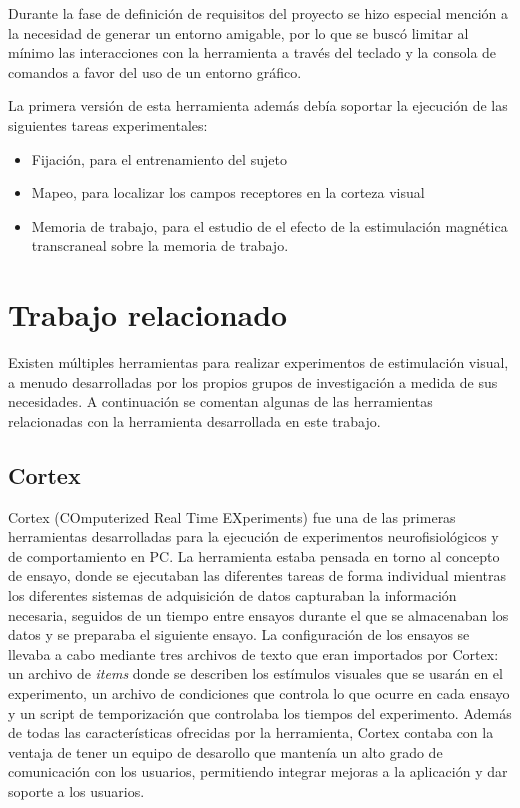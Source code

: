 \documentclass[conference]{IEEEtran}
\begin{document}
Durante la fase de definición de requisitos del proyecto se hizo especial mención a la necesidad de generar un entorno amigable, por lo que se buscó limitar al mínimo las interacciones con la herramienta a través del teclado y la consola de comandos a favor del uso de un entorno gráfico.

La primera versión de esta herramienta además debía soportar la ejecución de las siguientes tareas experimentales:

\begin{itemize}
	\item Fijación, para el entrenamiento del sujeto
	\item Mapeo, para localizar los campos receptores en la corteza visual
	\item Memoria de trabajo, para el estudio de el efecto de la estimulación magnética transcraneal sobre la memoria de trabajo.
\end{itemize}

\section{Trabajo relacionado}

Existen múltiples herramientas para realizar experimentos de estimulación visual, a menudo desarrolladas por los propios grupos de investigación a medida de sus necesidades. A continuación se comentan algunas de las herramientas relacionadas con la herramienta desarrollada en este trabajo.

\subsection{Cortex}

Cortex (COmputerized Real Time EXperiments)\cite{cortex} fue una de las primeras herramientas desarrolladas para la ejecución de experimentos neurofisiológicos y de comportamiento en PC.
La herramienta estaba pensada en torno al concepto de ensayo, donde se ejecutaban las diferentes tareas de forma individual mientras los diferentes sistemas de adquisición de datos capturaban la información necesaria, seguidos de un tiempo entre ensayos durante el que se almacenaban los datos y se preparaba el siguiente ensayo. 
La configuración de los ensayos se llevaba a cabo mediante tres archivos de texto que eran importados por Cortex: un archivo de \textit{items} donde se describen los estímulos visuales que se usarán en el experimento, un archivo de condiciones que controla lo que ocurre en cada ensayo y un script de temporización que controlaba los tiempos del experimento. Además de todas las características ofrecidas por la herramienta, Cortex contaba con la ventaja de tener un equipo de desarollo que mantenía un alto grado de comunicación con los usuarios, permitiendo integrar mejoras a la aplicación y dar soporte a los usuarios.
\end{document}
